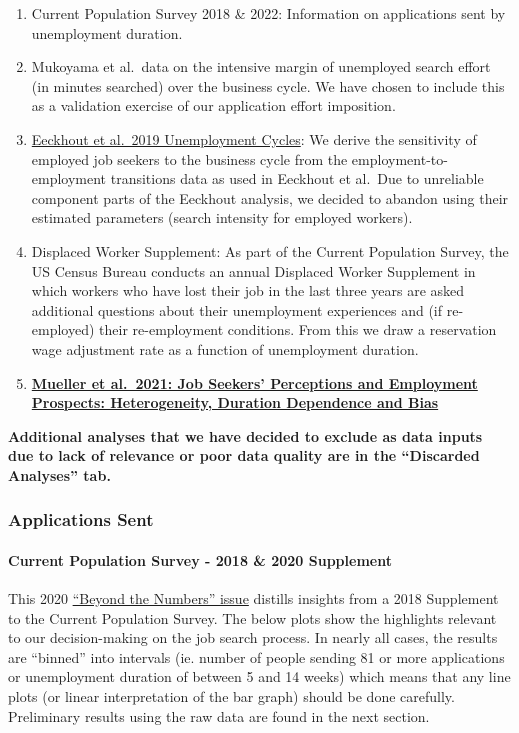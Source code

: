 \documentclass[
]{article}
\begin{document}
\begin{enumerate}
\def\labelenumi{\arabic{enumi}.}
\item
  Current Population Survey 2018 \& 2022: Information on applications
  sent by unemployment duration.
\item
  Mukoyama et al.~data on the intensive margin of unemployed search
  effort (in minutes searched) over the business cycle. We have chosen
  to include this as a validation exercise of our application effort
  imposition.
\item
  \href{https://www.aeaweb.org/articles?id=10.1257/mac.20180105}{Eeckhout
  et al.~2019 Unemployment Cycles}: We derive the sensitivity of
  employed job seekers to the business cycle from the
  employment-to-employment transitions data as used in Eeckhout et
  al.~Due to unreliable component parts of the Eeckhout analysis, we
  decided to abandon using their estimated parameters (search intensity
  for employed workers).
\item
  Displaced Worker Supplement: As part of the Current Population Survey,
  the US Census Bureau conducts an annual Displaced Worker Supplement in
  which workers who have lost their job in the last three years are
  asked additional questions about their unemployment experiences and
  (if re-employed) their re-employment conditions. From this we draw a
  reservation wage adjustment rate as a function of unemployment
  duration.
\item
  \href{https://www.aeaweb.org/articles?id=10.1257/aer.20190808}{\textbf{Mueller
  et al.~2021: Job Seekers' Perceptions and Employment Prospects:
  Heterogeneity, Duration Dependence and Bias}}
\end{enumerate}

\textbf{Additional analyses that we have decided to exclude as data
inputs due to lack of relevance or poor data quality are in the
``Discarded Analyses'' tab.}

\subsubsection{Applications Sent}\label{applications-sent}

\paragraph{Current Population Survey - 2018 \& 2020
Supplement}\label{current-population-survey---2018-2020-supplement}

This 2020
\href{https://www.bls.gov/opub/btn/volume-9/how-do-jobseekers-search-for-jobs.htm\#_edn5}{``Beyond
the Numbers'' issue} distills insights from a 2018 Supplement to the
Current Population Survey. The below plots show the highlights relevant
to our decision-making on the job search process. In nearly all cases,
the results are ``binned'' into intervals (ie. number of people sending
81 or more applications or unemployment duration of between 5 and 14
weeks) which means that any line plots (or linear interpretation of the
bar graph) should be done carefully. Preliminary results using the raw
data are found in the next section.
\end{document}
